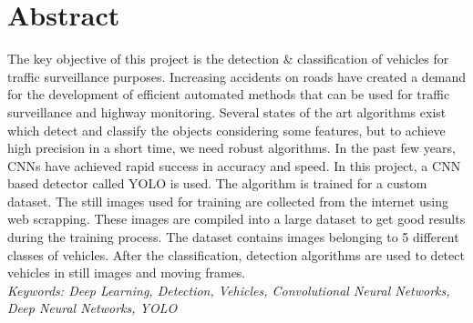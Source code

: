 
\chapter*{Abstract}
\vspace{-3mm}
The key objective of this project is the detection \& classification of vehicles for traffic surveillance purposes.
Increasing accidents on roads have created a demand for the development of efficient automated methods that can be used for traffic surveillance and highway monitoring.
Several states of the art algorithms exist which detect and classify the objects considering
some features, but to achieve high precision in a short time, we need robust algorithms. In the past few years, CNNs have
achieved rapid success in accuracy and speed. In this project, a CNN based detector called YOLO is used. The algorithm is
trained for a custom dataset. The still images used for training are collected from the internet using web scrapping. These images are compiled  into a
large dataset
to get good results during the training process. The dataset contains images belonging to 5 different classes of vehicles. After the classification, detection algorithms are used to detect vehicles in still images
and moving frames. 
\vspace{15mm}\ \\
\textit{Keywords: Deep Learning, Detection, Vehicles, Convolutional Neural Networks, Deep Neural Networks, YOLO}
